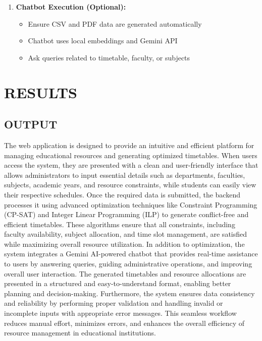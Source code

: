 \documentclass[a4paper, 12pt]{report}
\begin{document}
\begin{enumerate}
    \item \textbf{Chatbot Execution (Optional):}
    \begin{itemize}
        \item Ensure CSV and PDF data are generated automatically
        \item Chatbot uses local embeddings and Gemini API
        \item Ask queries related to timetable, faculty, or subjects
    \end{itemize}

\end{enumerate}

\chapter{RESULTS}
\section{OUTPUT}
The web application is designed to provide an intuitive and efficient platform for managing educational resources and generating optimized timetables. When users access the system, they are presented with a clean and user-friendly interface that allows administrators to input essential details such as departments, faculties, subjects, academic years, and resource constraints, while students can easily view their respective schedules. Once the required data is submitted, the backend processes it using advanced optimization techniques like Constraint Programming (CP-SAT) and Integer Linear Programming (ILP) to generate conflict-free and efficient timetables. These algorithms ensure that all constraints, including faculty availability, subject allocation, and time slot management, are satisfied while maximizing overall resource utilization. In addition to optimization, the system integrates a Gemini AI-powered chatbot that provides real-time assistance to users by answering queries, guiding administrative operations, and improving overall user interaction. The generated timetables and resource allocations are presented in a structured and easy-to-understand format, enabling better planning and decision-making. Furthermore, the system ensures data consistency and reliability by performing proper validation and handling invalid or incomplete inputs with appropriate error messages. This seamless workflow reduces manual effort, minimizes errors, and enhances the overall efficiency of resource management in educational institutions.
\end{document}
